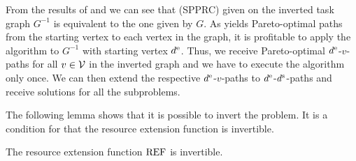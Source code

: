 From the results of  and  we can see that (SPPRC) given on the inverted task graph $G^{-1}$ is equivalent to the one given by $G$. As  yields Pareto-optimal paths from the starting vertex to each vertex in the graph, it is profitable to apply the algorithm to $G^{-1}$ with starting vertex $d^{\operatorname{e}}$. Thus, we receive Pareto-optimal $d^{\operatorname{e}}$-$v$-paths for all $v\in\mathcal{V}$ in the inverted graph and we have to execute the algorithm only once. We can then extend the respective $d^{\operatorname{e}}$-$v$-paths to $d^{\operatorname{e}}$-$d^{\operatorname{s}}$-paths and receive solutions for all the subproblems.

The following lemma shows that it is possible to invert the problem. It is a condition for  that the resource extension function is invertible.

\begin{lemma}

The resource extension function $\operatorname{REF}$ is invertible. 

\end{lemma}


